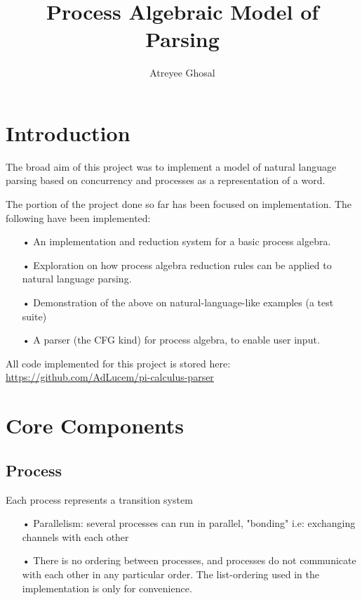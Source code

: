 \documentclass{article}
\title{Process Algebraic Model of Parsing}
\author{Atreyee Ghosal}
\begin{document}
\begin{titlepage}
\maketitle
\end{titlepage}

\section{Introduction}

The broad aim of this project was to implement a model of natural language parsing based on concurrency and processes as a representation of a word.

The portion of the project done so far has been focused on implementation. The following have been implemented:

\begin{itemize}
\item[•]
An implementation and reduction system for a basic process algebra.
\item[•]
Exploration on how process algebra reduction rules can be applied to natural language parsing.
\item[•]
Demonstration of the above on natural-language-like examples (a test suite)
\item[•]
A parser (the CFG kind) for process algebra, to enable user input.
\end{itemize}
 
All code implemented for this project is stored here: \href{https://github.com/AdLucem/pi-calculus-parser}{https://github.com/AdLucem/pi-calculus-parser}

\section{Core Components}

\subsection{Process}

Each process represents a transition system

\begin{itemize}
\item[•]
Parallelism: several processes can run in parallel, "bonding" i.e: exchanging channels with each other
\item[•]
There is no ordering between processes, and processes do not communicate with each other in any particular order. The list-ordering used in the implementation is only for convenience.
\end{itemize}
\end{document}
